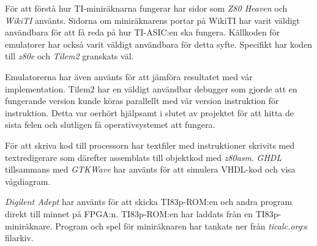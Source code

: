 \documentclass[main.tex]{subfiles}
\begin{document}
För att förstå hur TI-miniräknarna fungerar har sidor som {\it Z80
Heaven}\cite{z80heaven} och {\it WikiTI}\cite{brandonw} använts. Sidorna om
miniräknarens portar på WikiTI har varit väldigt användbara för att få reda på
hur TI-ASIC:en ska fungera. Källkoden för emulatorer har också varit väldigt
användbara för detta syfte. Specifikt har koden till {\it z80e}\cite{z80e} och
{\it Tilem2}\cite{tilem2} granskats väl.

Emulatorerna har även använts för att jämföra resultatet med vår
implementation. Tilem2 har en väldigt användbar debugger som gjorde att en
fungerande version kunde köras parallellt med vår version instruktion för
instruktion. Detta var oerhört hjälpsamt i slutet av projektet för att hitta de
sista felen och slutligen få operativsystemet att fungera.

För att skriva kod till processorn har textfiler med instruktioner skrivits med
textredigerare som därefter assemblats till objektkod med {\it
z80asm}\cite{z80asm}. {\it GHDL}\cite{ghdl} tillsammans med {\it
GTKWave}\cite{gtkwave} har använts för att simulera VHDL-kod och visa
vågdiagram.

{\it Digilent Adept} har använts för att skicka TI83p-ROM:en och andra program
direkt till minnet på FPGA:n. TI83p-ROM:en har laddats från en
TI83p-miniräknare. Program och spel för miniräknaren har tankats ner från
{\it ticalc.org}:s filarkiv\cite{ticalc}.

\end{document}
